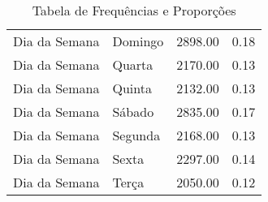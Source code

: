\begin{table}[ht]
\begin{tabular}{llrr}
  Dia da Semana & Domingo & 2898.00 & 0.18 \\ 
  Dia da Semana & Quarta & 2170.00 & 0.13 \\ 
  Dia da Semana & Quinta & 2132.00 & 0.13 \\ 
  Dia da Semana & Sábado & 2835.00 & 0.17 \\ 
  Dia da Semana & Segunda & 2168.00 & 0.13 \\ 
  Dia da Semana & Sexta & 2297.00 & 0.14 \\ 
  Dia da Semana & Terça & 2050.00 & 0.12 \\ 
   \hline
\end{tabular}
\caption{Tabela de Frequências e Proporções} 
\end{table}
